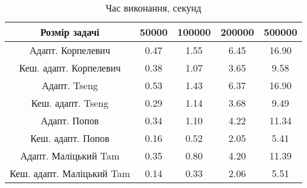 \begin{table}[H]
	\centering
	\begin{tabular}{|c||c|c|c|c|}\hline
		Розмір задачі & 50000 & 100000 & 200000 & 500000 \\ \hline \hline
		Адапт. Корпелевич & 0.47 & 1.55 & 6.45 & 16.90 \\ \hline
		Кеш. адапт. Корпелевич & 0.38 & 1.07 & 3.65 & 9.58 \\ \hline
		Адапт. Tseng & 0.53 & 1.43 & 6.37 & 16.90 \\ \hline
		Кеш. адапт. Tseng & 0.29 & 1.14 & 3.68 & 9.49 \\ \hline
		Адапт. Попов & 0.34 & 1.10 & 4.22 & 11.34 \\ \hline
		Кеш. адапт. Попов & 0.16 & 0.52 & 2.05 & 5.41 \\ \hline
		Адапт. Маліцький Tam & 0.35 & 0.80 & 4.20 & 11.39 \\ \hline
		Кеш. адапт. Маліцький Tam & 0.14 & 0.33 & 2.06 & 5.51 \\ \hline
	\end{tabular}
	\caption{Час виконання, секунд}
\end{table}
